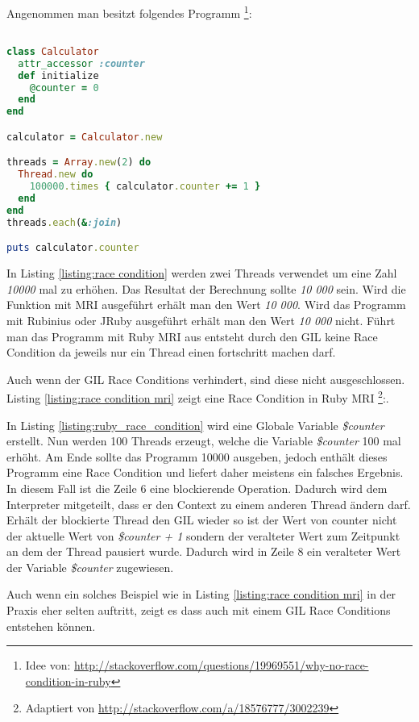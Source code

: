 Angenommen man besitzt folgendes Programm \footnote{Idee von: \url{http://stackoverflow.com/questions/19969551/why-no-race-condition-in-ruby}}: 

\begin{lstlisting}[language=Ruby,label={listing:race condition}]

class Calculator
  attr_accessor :counter
  def initialize
    @counter = 0
  end
end

calculator = Calculator.new

threads = Array.new(2) do
  Thread.new do
    100000.times { calculator.counter += 1 }
  end
end
threads.each(&:join)

puts calculator.counter

\end{lstlisting}

In Listing \ref{listing:race condition} werden zwei Threads verwendet um eine Zahl \emph{10000} mal zu erhöhen. Das Resultat der Berechnung sollte \emph{10 000} sein. Wird die Funktion mit MRI ausgeführt erhält man den Wert \emph{10 000}. Wird das Programm mit Rubinius oder JRuby ausgeführt erhält man den Wert \emph{10 000} nicht. Führt man das Programm mit Ruby MRI aus entsteht durch den GIL keine Race Condition da jeweils nur ein Thread einen fortschritt machen darf.

Auch wenn der GIL Race Conditions verhindert, sind diese nicht ausgeschlossen. Listing \ref{listing:race condition mri} zeigt eine Race Condition in Ruby MRI \footnote{Adaptiert von \url{http://stackoverflow.com/a/18576777/3002239}}:.

In Listing \ref{listing:ruby_race_condition} wird eine Globale Variable \emph{\$counter} erstellt. Nun werden 100 Threads erzeugt, welche die Variable \emph{\$counter} 100 mal erhöht. Am Ende sollte das Programm 10000 ausgeben, jedoch enthält dieses Programm eine Race Condition und liefert daher meistens ein falsches Ergebnis. In diesem Fall ist die Zeile 6 eine blockierende Operation. Dadurch wird dem Interpreter mitgeteilt, dass er den Context zu einem anderen Thread ändern darf. Erhält der blockierte Thread den GIL wieder so ist der Wert von counter nicht der aktuelle Wert von  \emph{\$counter + 1} sondern der veralteter Wert zum Zeitpunkt an dem der Thread pausiert wurde. Dadurch wird in Zeile 8 ein veralteter Wert der Variable \emph{\$counter} zugewiesen. 

Auch wenn ein solches Beispiel wie in Listing \ref{listing:race condition mri} in der Praxis eher selten auftritt, zeigt es dass auch mit einem GIL Race Conditions entstehen können.

